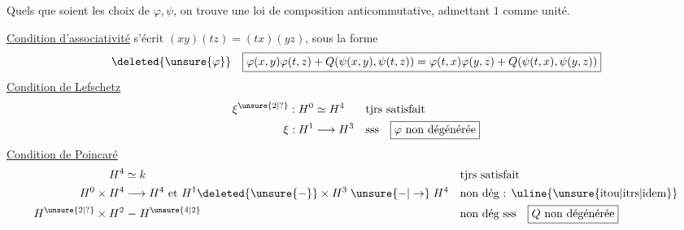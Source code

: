 Quels que soient les choix de $\varphi,\psi$, on trouve une loi de composition anticommutative, admettant $1$ comme unité.

\uline{Condition d'associativité} s'écrit $(xy)(tz)=(tx)(yz)$, sous la forme
\[
\deleted{\unsure{\varphi}}\quad
\boxed{\varphi(x,y)\varphi(t,z)+Q(\psi(x,y),\psi(t,z))=\varphi(t,x)\varphi(y,z)+Q(\psi(t,x),\psi(y,z))}
\]
\uline{Condition de Lefschetz}
\[
\begin{aligned}
\xi^{\unsure{2|?}}:H^0&\simeq H^4 &&\text{tjrs satisfait}\\
\xi:H^1&\longrightarrow H^3 &&\text{sss}\quad\boxed{\varphi\ \text{non dégénérée}}
\end{aligned}
\]
\uline{Condition de Poincaré}
\[
\begin{aligned}
H^4&\simeq k &&\text{tjrs satisfait}\\
H^0\times H^4&\longrightarrow H^4\ \text{et}\ H^1\deleted{\unsure{-}}\times H^3\mathrel{\unsure{-|\to}}H^4 &&\text{non dég : \uline{\unsure{itou|itrs|idem}}}\\
H^{\unsure{2|?}}\times H^2&\mathrel{-}H^{\unsure{4|2}} &&\text{non dég sss}\quad\boxed{Q\ \text{non dégénérée}}
\end{aligned}
\]
